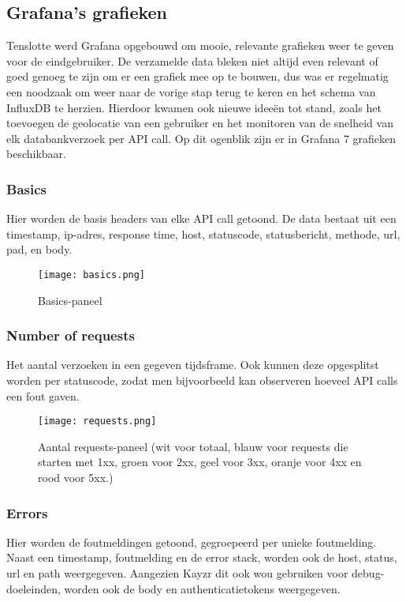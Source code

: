 \subsection{Grafana's grafieken}
\label{sec:graphs}

Tenslotte werd Grafana opgebouwd om mooie, relevante grafieken weer te geven voor de eindgebruiker. De verzamelde data bleken niet altijd even relevant of goed genoeg te zijn om er een grafiek mee op te bouwen, dus was er regelmatig een noodzaak om weer naar de vorige stap terug te keren en het schema van InfluxDB te herzien. Hierdoor kwamen ook nieuwe ideeën tot stand, zoals het toevoegen de geolocatie van een gebruiker en het monitoren van de snelheid van elk databankverzoek per API call. Op dit ogenblik zijn er in Grafana 7 grafieken beschikbaar.

\subsubsection{Basics}
\label{sec:basics}
Hier worden de basis headers van elke API call getoond. De data bestaat uit een timestamp, ip-adres, response time, host, statuscode, statusbericht, methode, url, pad, en body. 

\begin{figure}[h]
	\centering
	\texttt{[image: basics.png]}
	\caption{Basics-paneel}
	\label{fig:basics}
\end{figure}

\subsubsection{Number of requests}
\label{sec:numberofrequests}
Het aantal verzoeken in een gegeven tijdsframe. Ook kunnen deze opgesplitst worden per statuscode, zodat men bijvoorbeeld kan observeren hoeveel API calls een fout gaven.

\begin{figure}[h]
	\centering
	\texttt{[image: requests.png]}
	\caption{Aantal requests-paneel (wit voor totaal, blauw voor requests die starten met 1xx, groen voor 2xx, geel voor 3xx, oranje voor 4xx en rood voor 5xx.)}
	\label{fig:requests}
\end{figure}

\subsubsection{Errors}
\label{sec:errors}
Hier worden de foutmeldingen getoond, gegroepeerd per unieke foutmelding. Naast een timestamp, foutmelding en de error stack, worden ook de host, status, url en path weergegeven. Aangezien Kayzr dit ook wou gebruiken voor debug-doeleinden, worden ook de body en authenticatietokens weergegeven.

